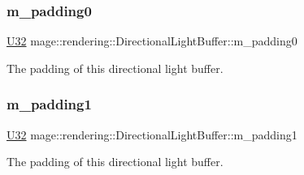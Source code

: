 \subsubsection{\texorpdfstring{m\+\_\+padding0}{m\_padding0}}
{\footnotesize\ttfamily \mbox{\hyperlink{namespacemage_a41c104c036fba3756a74e19f793eeaa1}{U32}} mage\+::rendering\+::\+Directional\+Light\+Buffer\+::m\+\_\+padding0}

The padding of this directional light buffer. \mbox{\label{structmage_1_1rendering_1_1_directional_light_buffer_a9e86dcc4f68340eb64408cf638996a69}} 
\subsubsection{\texorpdfstring{m\+\_\+padding1}{m\_padding1}}
{\footnotesize\ttfamily \mbox{\hyperlink{namespacemage_a41c104c036fba3756a74e19f793eeaa1}{U32}} mage\+::rendering\+::\+Directional\+Light\+Buffer\+::m\+\_\+padding1}

The padding of this directional light buffer. 